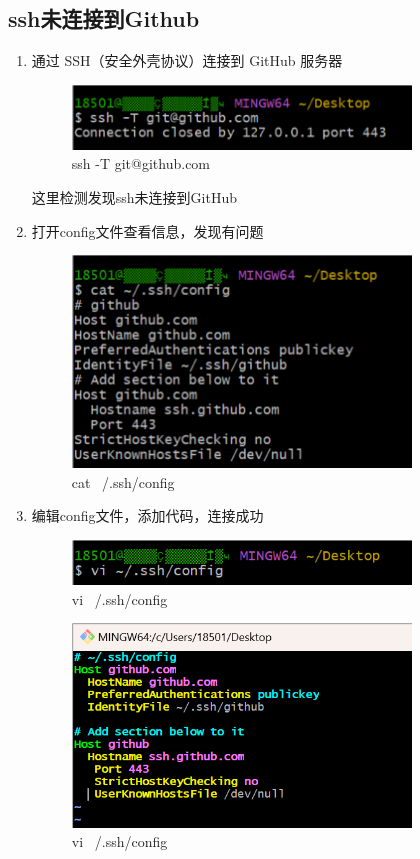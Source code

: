 \documentclass{ctexart}
\begin{document}
\subsection{ssh未连接到Github}
\begin{enumerate}
    \item 通过 SSH（安全外壳协议）连接到 GitHub 服务器\\
    \begin{figure}[H]
        \centering
        \includegraphics[width=9cm]{image.png}
        \caption{ssh -T git@github.com}
        \label{fig:21}
    \end{figure}
    这里检测发现ssh未连接到GitHub
    \item 打开config文件查看信息，发现有问题
    \begin{figure}[H]
        \centering
        \includegraphics[width=9cm]{image copy.png}
        \caption{cat ~/.ssh/config}
        \label{fig:22}
    \end{figure}
    \item 编辑config文件，添加代码，连接成功
    \begin{figure}[H]
        \centering
        \includegraphics[width=9cm]{1.png}
        \caption{vi ~/.ssh/config}
        \label{fig:23}
    \end{figure}
    \begin{figure}[htbp]
        \centering
        \includegraphics[width=9cm]{2.png}
        \caption{vi ~/.ssh/config}
        \label{fig:24}
    \end{figure}
\end{enumerate}
\end{document}
